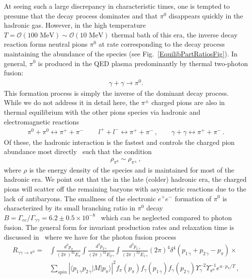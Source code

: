 \documentclass[universe,article,submit,moreauthors,pdftex,a4paper]{Definitions/mdpi}
\newcommand{\MeV}{\text{ MeV}}
\newcommand*{\rf}[1]{Fig.~{\ref{#1}}}
\begin{document}
At seeing such a large discrepancy in characteristic times, one is tempted to presume that the decay process dominates and that $\pi^0$ disappears quickly in the hadronic gas. However, in the high temperature $T=\mathcal{O}(100\MeV)\sim\mathcal{O}(10\MeV)$ thermal bath of this era, the inverse decay reaction forms neutral pions $\pi^0$ at rate corresponding to the decay process maintaining the abundance of the species (see \rf{EquilibPartRatiosFig}). In general, $\pi^0$ is produced in the QED plasma predominantly by thermal two-photon fusion:
\begin{align}
\gamma+\gamma \rightarrow \pi^{0}. 
\end{align}
This formation process is simply the inverse of the dominant decay process. While we do not address it in detail here, the $\pi^{\pm}$ charged pions are also in thermal equilibrium with the other pions species via hadronic and electromagnetic reactions
\begin{align}
    \pi^{0}+\pi^{0}\leftrightarrow\pi^{+}+\pi^{-}\,\qquad l^{+}+l^{-}\leftrightarrow\pi^{+}+\pi^{-}\,,\qquad\gamma+\gamma\leftrightarrow\pi^{+}+\pi^{-}\,.
\end{align}
Of these, the hadronic interaction is the fastest and controls the charged pion abundance most directly~\cite{Kuznetsova:2009xh,Fromerth:2012fe} such that the condition
\begin{align}
    \rho_{\pi^{0}}\sim\rho_{\pi^{\pm}}\,,
\end{align}
where $\rho$ is the energy density of the species and is maintained for most of the hadronic era. We point out that the in the late (colder) hadronic era, the charged pions will scatter off the remaining baryons with asymmetric reactions due to the lack of antibaryons. The smallness of the electronic $e^{+}e^{-}$ formation of $\pi^0$ is characterized by its small branching ratio in $\pi^0$ decay $B=\Gamma_{ee}/\Gamma_{\gamma\gamma}=6.2\pm 0.5\times10^{-8}$~\cite{ParticleDataGroup:2018ovx} which can be neglected compared to photon fusion. The general form for invariant production rates and relaxation time is discussed in~\cite{Kuznetsova:2008jt} where we have for the photon fusion process
\begin{align}
R_{\gamma\gamma\to\pi^0}=&\int\frac{d^{3}{p_{\pi}}}{(2\pi\ )^32E_{\pi}}
 \int\frac{d^{3} {p_{2\,\gamma}}}{(2\pi\ )^32E_{2\,\gamma}}
 \int\frac{d^{3}{p_{1\,\gamma}}} {(2\pi\ )^32E_{1\,\gamma} }\left(2\pi\right)^{4}
 \delta^{4}\left(p_{1\,\gamma}+p_{2\,\gamma}-p_{\pi}\right)\times \nonumber\\ &
 \sum_{spin}\left|\langle p_{1\,\gamma}p_{2\,\gamma}\left| M\right|p_{\pi}\rangle\right|^{2}
 f_{\pi}(p_{\pi})f_{\gamma}(p_{1\,\gamma})f_{\gamma}(p_{2\,\gamma})
 \Upsilon^{-2}_{\gamma}\Upsilon_{\pi^{0}}^{-1}e^{u \cdot p_{\pi}/T}\,, \label{pi0pr}
 \end{align}
\end{document}
